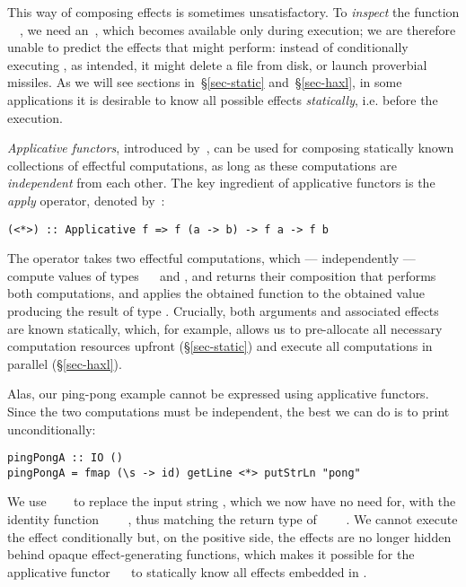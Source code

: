 This way of composing effects is sometimes unsatisfactory. To \emph{inspect} the
function \hs{\s}~\hs{->}~, we need an~, which becomes available
only during execution; we are therefore unable to predict the effects that
 might perform: instead of conditionally executing ,
as intended, it might delete a file from disk, or launch proverbial missiles. As
we will see sections in~\S\ref{sec-static} and~\S\ref{sec-haxl}, in some
applications it is desirable to know all possible effects \emph{statically},
i.e. before the execution.

\emph{Applicative functors}, introduced by~\citet{mcbride2008applicative}, can
be used for composing statically known collections of effectful computations, as
long as these computations are \emph{independent} from each other. The key
ingredient of applicative functors is the \emph{apply} operator, denoted
by~\hs{<*>}:

\vspace{1mm}
\begin{verbatim}
(<*>) :: Applicative f => f (a -> b) -> f a -> f b
\end{verbatim}
\vspace{1mm}
\newpage

The operator takes two effectful computations, which --- independently ---
compute values of types ~\hs{->}~ and , and returns their
composition that performs both computations, and applies the obtained function
to the obtained value producing the result of type . Crucially, both
arguments and associated effects are known statically, which, for example,
allows us to pre-allocate all necessary computation resources upfront
(\S\ref{sec-static}) and execute all computations in parallel
(\S\ref{sec-haxl}).

Alas, our ping-pong example cannot be expressed using applicative functors.
Since the two computations must be independent, the best we can do is to print
 unconditionally:

\vspace{0.5mm}
\begin{verbatim}
pingPongA :: IO ()
pingPongA = fmap (\s -> id) getLine <*> putStrLn "pong"
\end{verbatim}
\vspace{0.5mm}

\noindent
We use ~\hs{(\s}~\hs{->}~ to replace the input string ,
which we now have no need for, with the identity function
~\hs{::}~\hs{()}~\hs{->}~\hs{()}, thus matching the return type of
~~\hs{::}~~\hs{()}. We cannot execute the
 effect conditionally but, on the positive side, the effects are no
longer hidden behind opaque effect-generating functions, which makes it possible
for the applicative functor ~\hs{=}~ to statically know all effects
embedded in .


